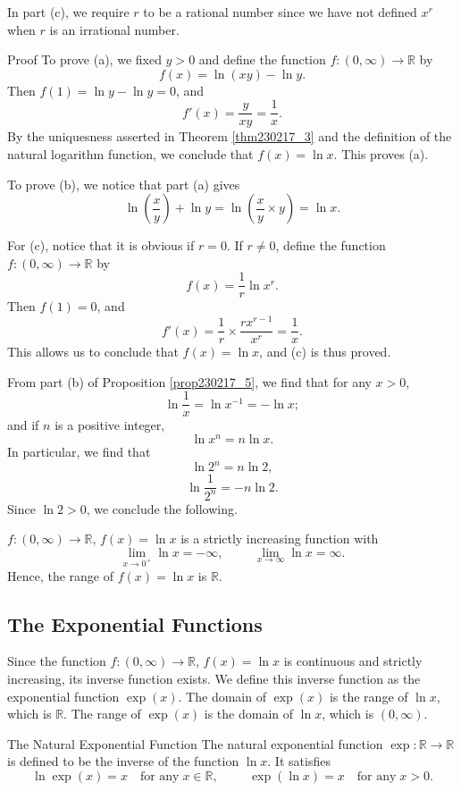 In part (c), we require $r$ to be a rational number since we have not defined $x^r$ when $r$ is an irrational number.
\begin{myproof}{Proof}
To prove (a), we fixed $y>0$ and define the function $f:(0,\infty)\to\mathbb{R}$ by
\[f(x)=\ln(xy)-\ln y.\] 
Then $f(1)=\ln y-\ln y=0$, and
\[f'(x)=\frac{y}{xy}=\frac{1}{x}.\]
By the uniquesness asserted in Theorem \ref{thm230217_3} and the definition of the natural logarithm function, we conclude that $f(x)=\ln x$. This proves (a).\bp

To prove (b), we notice that part (a) gives
\[ \ln\left(\frac{x}{y}\right)+\ln y=\ln\left(\frac{x}{y}\times y\right)=\ln x.\] 

For (c), notice that it is obvious if $r=0$. If $r\neq 0$,   define the function $f:(0,\infty)\to\mathbb{R}$ by
\[f(x)= \frac{1}{r}\ln x^r.\]   Then $f(1)=0$, and
\[f'(x)=\frac{1}{r}\times\frac{rx^{r-1}}{x^r}=\frac{1}{x}.\]
This allows us to conclude that $f(x)=\ln x$, and (c) is thus proved.



\end{myproof}

From part (b) of Proposition \ref{prop230217_5}, we find that for any $x>0$,
\[\ln \frac{1}{x}= \ln x^{-1}=-\ln x;\]
and if $n$ is a positive integer, 
\[\ln x^n=n\ln x.\]
In particular, we find that
\[\ln 2^n=n\ln 2,\]
\[\ln \frac{1}{2^n}=-n\ln 2.\]
Since $\ln 2>0$, we conclude the following.
\begin{proposition}{}
$f:(0, \infty)\to\mathbb{R}$, $f(x)=\ln x$ is a strictly increasing function with
\[\lim_{x\rightarrow 0^+}\ln x=-\infty,\hspace{1cm}\lim_{x\to \infty}\ln x=\infty.\]
Hence, the range of $f(x)=\ln x$ is $\mathbb{R}$. 
\end{proposition}

\subsection{The Exponential Functions}
Since the function $f:(0,\infty)\to\mathbb{R}$, $f(x)=\ln x$ is continuous and strictly increasing, its inverse function exists. We define this inverse function as the exponential function $\exp(x)$. The domain of $\exp(x)$ is the range of $\ln x$, which is $\mathbb{R}$. The range of $\exp(x)$ is the domain of $\ln x$, which is $(0, \infty)$.
\begin{definition}{The Natural Exponential Function}
The natural exponential function $\exp :\mathbb{R}\to \mathbb{R}$ is defined to be the inverse of the function $ \ln x$. It satisfies
\[\ln \exp(x)=x \quad\text{for any}\;x\in\mathbb{R},\hspace{1cm}
 \exp(\ln x)=x\quad\text{for any}\;x>0.\]
\end{definition}

